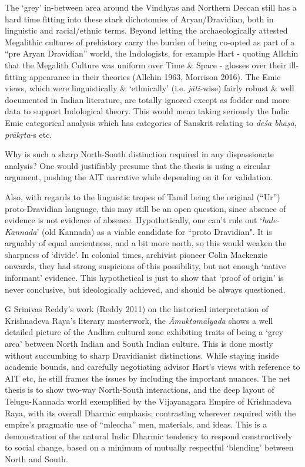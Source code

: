 The ‘grey’ in-between area around the Vindhyas and Northern Deccan still has a hard time fitting into these stark dichotomies of Aryan/Dravidian, both in linguistic and racial/ethnic terms. Beyond letting the archaeologically attested Megalithic cultures of prehistory carry the burden of being co-opted as part of a “pre Aryan Dravidian” world, the Indologists, for example Hart - quoting Allchin that the Megalith Culture was uniform over Time \& Space - glosses over their ill-fitting appearance in their theories (Allchin 1963, Morrison 2016). The Emic views, which were linguistically \& ‘ethnically’ (i.e. \textit{jāti-}wise) fairly robust \& well documented in Indian literature, are totally ignored except as fodder and more data to support Indological theory. This would mean taking seriously the Indic Emic categorical analysis which has categories of Sanskrit relating to \textit{deśa bhāṣā}, \textit{prākṛta}-s etc.

Why is such a sharp North-South distinction required in any dispassionate analysis? One would justifiably presume that the thesis is using a circular argument, pushing the AIT narrative while depending on it for validation.

Also, with regards to the linguistic tropes of Tamil being the original (“Ur”) proto-Dravidian language, this may still be an open question, since absence of evidence is not evidence of absence. Hypothetically, one can’t rule out ‘\textit{hale-Kannada}’ (old Kannada) as a viable candidate for “proto Dravidian". It is arguably of equal ancientness, and a bit more north, so this would weaken the sharpness of ‘divide’. In colonial times, archivist pioneer Colin Mackenzie onwards, they had strong suspicions of this possibility, but not enough ‘native informant’ evidence. This hypothetical is just to show that ‘proof of origin’ is never conclusive, but ideologically achieved, and should be always questioned.

G Srinivas Reddy’s work (Reddy 2011) on the historical interpretation of Krishnadeva Raya’s literary masterwork, the \textit{Āmuktamālyada} shows a well detailed picture of the Andhra cultural zone exhibiting traits of being a ‘grey area’ between North Indian and South Indian culture. This is done mostly without succumbing to sharp Dravidianist distinctions. While staying inside academic bounds, and carefully negotiating advisor Hart’s views with reference to AIT etc, he still frames the issues by including the important nuances. The net thesis is to show two-way North-South interactions, and the deep layout of Telugu-Kannada world exemplified by the Vijayanagara Empire of Krishnadeva Raya, with its overall Dharmic emphasis; contrasting wherever required with the empire’s pragmatic use of “mleccha” men, materials, and ideas. This is a demonstration of the natural Indic Dharmic tendency to respond constructively to social change, based on a minimum of mutually respectful ‘blending’ between North and South.


